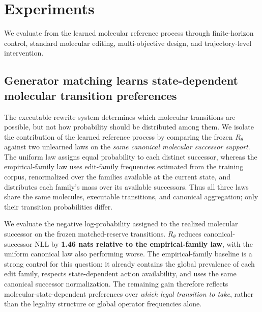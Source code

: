 %
\section{Experiments}
\label{sec:experiments}

We evaluate \method{} from the learned molecular reference process through finite-horizon control, standard molecular editing, multi-objective design, and trajectory-level intervention.

\subsection{Generator matching learns state-dependent molecular transition preferences}
\label{sec:exp-rtheta}

The executable rewrite system determines which molecular transitions are possible, but not how probability should be distributed among them. We isolate the contribution of the learned reference process by comparing the frozen $R_\theta$ against two unlearned laws on the \emph{same canonical molecular successor support}. The uniform law assigns equal probability to each distinct successor, whereas the empirical-family law uses edit-family frequencies estimated from the training corpus, renormalized over the families available at the current state, and distributes each family's mass over its available successors. Thus all three laws share the same molecules, executable transitions, and canonical aggregation; only their transition probabilities differ.

We evaluate the negative log-probability assigned to the realized molecular successor on the frozen matched-reserve transitions. $R_\theta$ reduces canonical-successor NLL by \textbf{1.46 nats relative to the empirical-family law}, with the uniform canonical law also performing worse. The empirical-family baseline is a strong control for this question: it already contains the global prevalence of each edit family, respects state-dependent action availability, and uses the same canonical successor normalization. The remaining gain therefore reflects molecular-state-dependent preferences over \emph{which legal transition to take}, rather than the legality structure or global operator frequencies alone.


